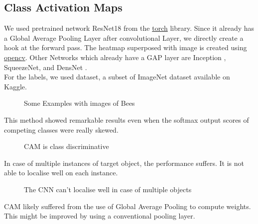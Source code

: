 \subsection{Class Activation Maps}
We used pretrained network ResNet18 \cite{ResNet} from the \href{https://pytorch.org/}{torch} library. 
Since it already has a Global Average Pooling Layer after convolutional Layer, we directly create a hook at the forward pass. The heatmap superposed with image is created using \href{https://opencv.org/}{opencv}.
Other Networks which already have a GAP layer are Inception \cite{Inception}, SqueezeNet\cite{SqueezeNet}, and DensNet \cite{DensNet}.\\
For the labels, we used \cite{ILSVRC} dataset, a subset of ImageNet dataset available on Kaggle.
\begin{figure}[H]
    \centering
    \qquad
    \caption[Short text]{Some Examples with images of Bees}
    \label{fig:Some_Examples}
\end{figure}
This method showed remarkable results even when the softmax output scores of competing classes were really skewed.

\begin{figure}[H]
    \centering
    \qquad
    \qquad
    \qquad
    \caption[Short text]{CAM is class discriminative}
    \label{fig:Defi}
\end{figure}

In case of multiple instances of target object, the performance suffers. It is not able to localise well on each instance.

\begin{figure}[H]
    \centering
    \qquad
    \caption[Short text]{The CNN can't localise well in case of multiple objects}
    \label{fig:Defi}
\end{figure}

CAM likely suffered from the use of Global Average Pooling to compute weights. This might be improved by using a conventional pooling layer.   